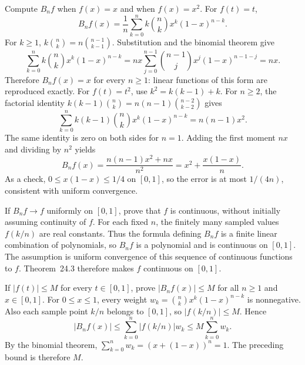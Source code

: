 \goal Compute $B_nf$ when $f(x)=x$ and when $f(x)=x^2$.
For $f(t)=t$,
\[
 B_nf(x)=\frac1n\sum_{k=0}^n k\binom nk x^k(1-x)^{n-k}.
\]
For $k\ge1$, $k\binom nk=n\binom{n-1}{k-1}$. Substitution and the
binomial theorem give
\[
 \sum_{k=0}^n k\binom nk x^k(1-x)^{n-k}
 =nx\sum_{j=0}^{n-1}\binom{n-1}{j}x^j(1-x)^{n-1-j}=nx.
\]
Therefore $B_nf(x)=x$ for every $n\ge1$: linear functions of this form
are reproduced exactly.
For $f(t)=t^2$, use $k^2=k(k-1)+k$.
For $n\ge2$, the factorial identity
$k(k-1)\binom nk=n(n-1)\binom{n-2}{k-2}$ gives
\[
 \sum_{k=0}^n k(k-1)\binom nk x^k(1-x)^{n-k}=n(n-1)x^2.
\]
The same identity is zero on both sides for $n=1$.
Adding the first moment $nx$ and dividing by $n^2$ yields
\[
 B_nf(x)=\frac{n(n-1)x^2+nx}{n^2}
 =x^2+\frac{x(1-x)}n.
\]
As a check, $0\le x(1-x)\le1/4$ on $[0,1]$, so the error is at most
$1/(4n)$, consistent with uniform convergence.

\goal If $B_nf\to f$ uniformly on $[0,1]$, prove that $f$ is continuous,
without initially assuming continuity of $f$.
For each fixed $n$, the finitely many sampled values $f(k/n)$ are real constants.
Thus the formula defining $B_nf$ is a finite linear combination of polynomials,
so $B_nf$ is a polynomial and is continuous on $[0,1]$.
The assumption is uniform convergence of this sequence of continuous functions
to $f$. Theorem~24.3 therefore makes $f$ continuous on $[0,1]$.

\goal If $|f(t)|\le M$ for every $t\in[0,1]$, prove $|B_nf(x)|\le M$
for all $n\ge1$ and $x\in[0,1]$.
For $0\le x\le1$, every weight $w_k=\binom nkx^k(1-x)^{n-k}$ is nonnegative.
Also each sample point $k/n$ belongs to $[0,1]$, so $|f(k/n)|\le M$.
Hence
\[
 |B_nf(x)|\le\sum_{k=0}^n|f(k/n)|w_k
 \le M\sum_{k=0}^n w_k.
\]
By the binomial theorem,
$\sum_{k=0}^n w_k=(x+(1-x))^n=1$.
The preceding bound is therefore $M$.
